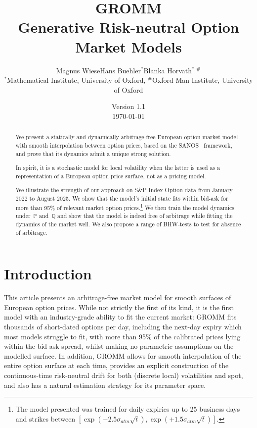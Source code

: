 \documentclass[11pt]{article}
\title{%
  \textbf{GROMM}\\[6pt]
  \large Generative Risk-neutral Option Market Models
}
\author{Magnus Wiese\qquad Hans Buehler$^{*}$\qquad Blanka Horvath$^{*,\#}$\\[0.6em]
  {\small $^{*}$Mathematical Institute, University of Oxford, 
  $^{\#}$Oxford-Man Institute, University of Oxford}}
\date{Version 1.1\\ \today}
\newcommand{\Q}{\mathbb Q}
\newcommand{\PP}{\mathbb P}
\theoremstyle{plain}
\theoremstyle{definition}
\theoremstyle{remark}
\begin{document}
\maketitle

\begin{abstract}
    We present a statically and dynamically arbitrage-free European option market model with smooth
    interpolation between option prices, based on the SANOS~\citep{SANOS2026} framework, and prove that its dynamics admit a unique strong solution. 

    In spirit,
    it is a stochastic model for local volatility when the latter is used as a representation of a European option price surface, not as a pricing model.

  We illustrate the strength of our approach on S\&P Index Option data from January 2022 to August 2025.
  We show that the model's initial state fits within bid-ask for more than 95\% of relevant market option prices.\footnote{
        The model presented was trained for daily expiries up to 25 business days and strikes between $[\exp(-2.5 \sigma_{atm} \sqrt{t}), \exp(+1.5 \sigma_{atm} \sqrt{t})]$.}
    We then train the model dynamics under~$\PP$ and~$\Q$ and show that the model is indeed free of arbitrage
    while fitting the dynamics of the market well.
    We also propose a range of BHW-tests to test for absence of arbitrage. 
\end{abstract}

\tableofcontents


\section{Introduction}\label{sec:intro}

This article presents an arbitrage-free market model for smooth surfaces of European option prices. While not strictly the first of its kind, it is the first model with an industry-grade ability to fit the current market: GROMM fits thousands of short-dated options per day, including the next-day expiry which most models struggle to fit, with more than 95\% of the calibrated prices lying within the bid-ask spread, whilst making no parametric assumptions on the modelled surface. In addition, GROMM allows for smooth interpolation of the entire option surface at each time, provides an explicit construction of the continuous-time risk-neutral drift for both (discrete local) volatilities and spot, and also has a natural estimation strategy for its parameter space.
\end{document}
